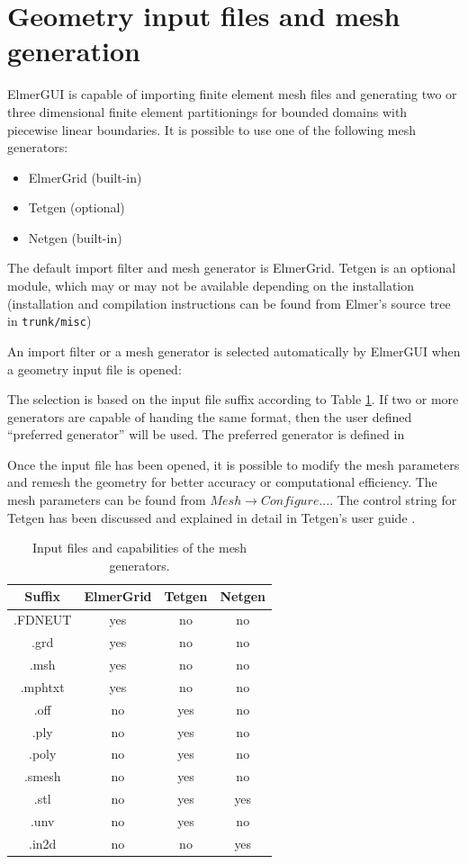 \section{Geometry input files and mesh generation}

ElmerGUI is capable of importing finite element mesh files and generating two or three
dimensional finite element partitionings for bounded domains with piecewise linear
boundaries. It is possible to use one of the following mesh generators:
\begin{itemize}
 \item ElmerGrid (built-in)
 \item Tetgen (optional)
 \item Netgen (built-in)
\end{itemize}
The default import filter and mesh generator is ElmerGrid. Tetgen is an optional
module, which may or may not be available depending on the installation (installation and
compilation instructions can be found from Elmer's source tree in {\tt trunk/misc})

An import filter or a mesh generator is selected automatically by ElmerGUI when a geometry
input file is opened:


The selection is based on the input file suffix according to Table \ref{table:inputfiles}. If two or more
generators are capable of handing the same format, then the user defined ``preferred
generator'' will be used. The preferred generator is defined in


Once the input file has been opened, it is possible to modify the mesh parameters
and remesh the geometry for better accuracy or computational efficiency. The mesh parameters
can be found from $Mesh \rightarrow Configure...$. The control string for Tetgen
has been discussed and explained in detail in Tetgen's user guide \cite{TetgenHome}.

\begin{table}
	\caption{Input files and capabilities of the mesh generators.}
	\label{table:inputfiles}
	\begin{center}
		\begin{tabular}{|c|c|c|c|}
		\hline
		 Suffix & ElmerGrid & Tetgen & Netgen \\
		\hline 
		.FDNEUT & yes & no & no \\
		.grd  & yes & no & no \\
		.msh & yes & no & no \\
		.mphtxt & yes & no & no \\
		.off & no & yes & no \\
		.ply & no & yes & no \\
		.poly & no & yes & no \\
		.smesh & no & yes & no \\
		.stl  & no & yes & yes \\
		.unv & no & yes & no \\
		.in2d & no & no & yes \\
		\hline
		\end{tabular}
	\end{center}
\end{table}

